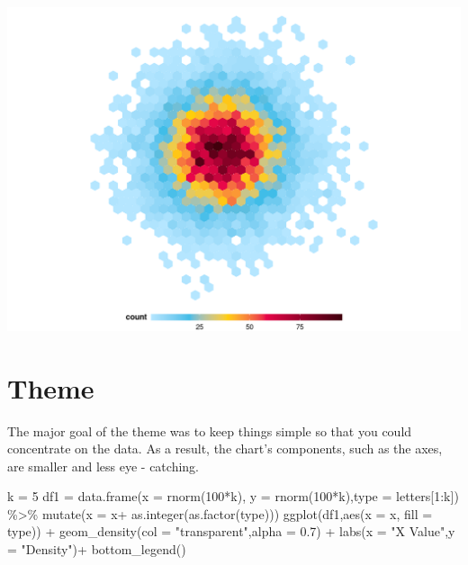 \documentclass[
]{book}
\newenvironment{Shaded}{\begin{snugshade}}{\end{snugshade}}
\newcommand{\AttributeTok}[1]{\textcolor[rgb]{0.77,0.63,0.00}{#1}}
\newcommand{\DecValTok}[1]{\textcolor[rgb]{0.00,0.00,0.81}{#1}}
\newcommand{\FloatTok}[1]{\textcolor[rgb]{0.00,0.00,0.81}{#1}}
\newcommand{\FunctionTok}[1]{\textcolor[rgb]{0.00,0.00,0.00}{#1}}
\newcommand{\NormalTok}[1]{#1}
\newcommand{\OtherTok}[1]{\textcolor[rgb]{0.56,0.35,0.01}{#1}}
\newcommand{\SpecialCharTok}[1]{\textcolor[rgb]{0.00,0.00,0.00}{#1}}
\newcommand{\StringTok}[1]{\textcolor[rgb]{0.31,0.60,0.02}{#1}}
\begin{document}
\begin{center}\includegraphics[height=0.5\textheight]{figures/continous_palette-1} \end{center}

\hypertarget{theme}{%
\section{Theme}\label{theme}}

The major goal of the theme was to keep things simple so that you could concentrate
on the data. As a result, the chart's components, such as the axes, are smaller and less eye - catching.

\begin{Shaded}
\begin{Highlighting}[]
\NormalTok{k }\OtherTok{=} \DecValTok{5}
\NormalTok{df1 }\OtherTok{=} \FunctionTok{data.frame}\NormalTok{(}\AttributeTok{x =} \FunctionTok{rnorm}\NormalTok{(}\DecValTok{100}\SpecialCharTok{*}\NormalTok{k), }\AttributeTok{y =} \FunctionTok{rnorm}\NormalTok{(}\DecValTok{100}\SpecialCharTok{*}\NormalTok{k),}\AttributeTok{type =}\NormalTok{ letters[}\DecValTok{1}\SpecialCharTok{:}\NormalTok{k]) }\SpecialCharTok{\%\textgreater{}\%} 
  \FunctionTok{mutate}\NormalTok{(}\AttributeTok{x =}\NormalTok{ x}\SpecialCharTok{+} \FunctionTok{as.integer}\NormalTok{(}\FunctionTok{as.factor}\NormalTok{(type)))}
\FunctionTok{ggplot}\NormalTok{(df1,}\FunctionTok{aes}\NormalTok{(}\AttributeTok{x =}\NormalTok{ x, }\AttributeTok{fill =}\NormalTok{ type)) }\SpecialCharTok{+} 
  \FunctionTok{geom\_density}\NormalTok{(}\AttributeTok{col =} \StringTok{"transparent"}\NormalTok{,}\AttributeTok{alpha =} \FloatTok{0.7}\NormalTok{) }\SpecialCharTok{+} 
  \FunctionTok{labs}\NormalTok{(}\AttributeTok{x =} \StringTok{"X Value"}\NormalTok{,}\AttributeTok{y =} \StringTok{"Density"}\NormalTok{)}\SpecialCharTok{+}
  \FunctionTok{bottom\_legend}\NormalTok{()}
\end{Highlighting}
\end{Shaded}
\end{document}

